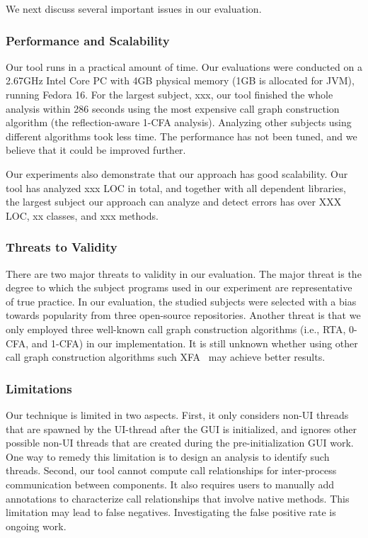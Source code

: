 We next discuss several important issues in our evaluation.

\subsubsection{Performance and Scalability}

Our tool runs in a practical amount of time. Our evaluations
were conducted on a 2.67GHz Intel Core PC with 4GB
physical memory (1GB is allocated for JVM), running Fedora 16.
For the largest subject, xxx, our tool finished the whole analysis
within 286 seconds using the most expensive call graph construction
algorithm (the reflection-aware 1-CFA analysis). Analyzing
other subjects using different algorithms took less time.
The performance has not been tuned, and we believe
that it could be improved further.

Our experiments also demonstrate that our approach has good scalability.
Our tool has analyzed xxx LOC in total, and together with all dependent libraries,
the largest subject our approach can analyze and detect errors has
over XXX LOC, xx classes, and xxx methods.



\subsubsection{Threats to Validity}

There are two major threats to validity in our evaluation. 
The major threat is the degree to which the subject programs
used in our experiment are representative of true practice.
In our evaluation, the studied subjects were selected with a bias towards popularity from
three open-source repositories. Another threat is that we only employed three
well-known call graph construction algorithms (i.e., RTA, 0-CFA, and 1-CFA) 
in our implementation. It is still unknown whether using other 
call graph construction algorithms such XFA~\cite{} may achieve better results.

\subsubsection{Limitations}

Our technique is limited in two aspects. First, it only considers
non-UI threads that are spawned by the UI-thread after the GUI
is initialized, and ignores other possible non-UI threads
that are created during the pre-initialization GUI work. One way
to remedy this limitation is to design an analysis to identify
such threads. Second, our tool cannot compute call relationships
for inter-process communication between components. It also
requires users to manually add annotations to characterize
call relationships that involve native methods. This limitation
may lead to false negatives. Investigating the false positive
rate is ongoing work.

